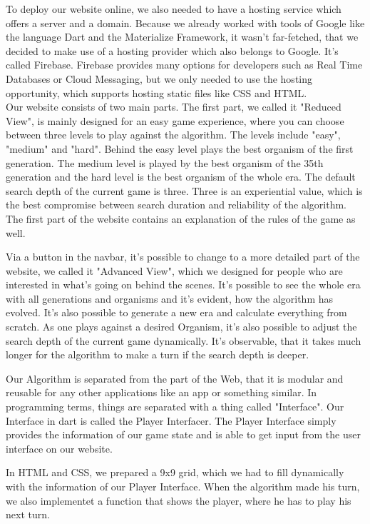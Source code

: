 To deploy our website online, we also needed to have a hosting service which offers a server and a domain. Because we already worked with tools of Google like the language Dart and the Materialize Framework, it wasn't far-fetched, that we decided to make use of a hosting provider which also belongs to Google. It's called Firebase. Firebase provides many options for developers such as Real Time Databases or Cloud Messaging, but we only needed to use the hosting opportunity, which supports hosting static files like CSS and HTML.\\

Our website consists of two main parts. The first part, we called it "Reduced View", is mainly designed for an easy game experience, where you can choose between three levels to play against the algorithm. The levels include "easy", "medium" and "hard". Behind the easy level plays the best organism of the first generation. 
The medium level is played by the best organism of the 35th %
generation and the hard level is the best organism of the whole era. The default search depth of the current game is three. Three is an experiential value, which is the best compromise between search duration and reliability of the algorithm.
The first part of the website contains an explanation of the rules of the game as well.

Via a button in the navbar, it's possible to change to a more detailed  part of the website, we called it "Advanced View", which we designed for people who are interested in what's going on behind the scenes. It's possible to see the whole era with all generations and organisms and it's evident, how the algorithm has evolved. It's also possible to generate a new era and calculate everything from scratch. As one plays against a desired Organism, it's also possible to adjust the search depth of the current game dynamically. It's observable, that it takes much longer for the algorithm to make a turn if the search depth is deeper. %

Our Algorithm is separated from the part of the Web, that it is modular and reusable for any other applications like an app or something similar. In programming terms, things are separated with a thing called "Interface". Our Interface in dart is called the Player Interfacer. The Player Interface simply provides the information of our game state and is able to get input from the user interface on our website.

In HTML and CSS, we prepared a 9x9 grid, which we had to fill dynamically with the information of our Player Interface. When the algorithm made his turn, we also implementet a function that shows the player, where he has to play his next turn. 


